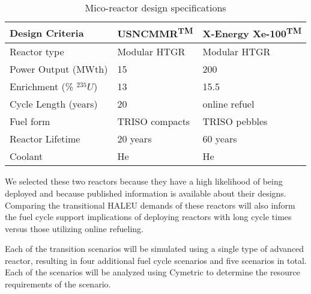 \begin{table}
    \caption{Mico-reactor design specifications}
    \label{tab:reactor_summary}
    \begin{tabular}{p{2.5cm}p{2.25cm}p{2.5cm}}
        \hline
        Design Criteria & \gls{USNC}\gls{MMR}\textsuperscript{TM} & 
            X-Energy Xe-100\textsuperscript{TM} \\\hline
        Reactor type & Modular HTGR & Modular HTGR \\
        Power Output (MWth) & 15 & 200 \\
        Enrichment (\% $^{235}U$) & 13 & 15.5 \\
        Cycle Length (years) & 20 & online refuel\\
        Fuel form & \gls{TRISO} compacts & \gls{TRISO} pebbles\\
        Reactor Lifetime & 20 years & 60 years \\
        Coolant & He & He \\
        \hline
    \end{tabular}
\end{table}
    
We selected these two reactors because they have a high 
likelihood of being deployed and because published information is 
available about their designs. Comparing the transitional \gls{HALEU} 
demands of these reactors will also inform the fuel cycle support 
implications of deploying reactors with long cycle 
times versus those utilizing online refueling. 

Each of the transition scenarios will be simulated using a single type of 
advanced reactor, resulting in four additional fuel cycle scenarios and five 
scenarios in total. Each of the scenarios will be analyzed using Cymetric
\cite{scopatz_cymetric_2015} to determine the resource requirements of the 
scenario. 